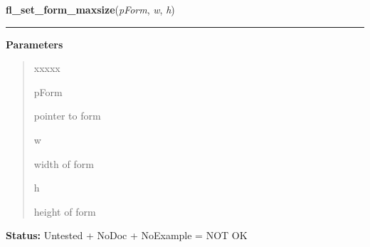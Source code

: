 \hspace{.8\funcindent}\begin{boxedminipage}{\funcwidth}

    \raggedright \textbf{fl\_set\_form\_maxsize}(\textit{pForm}, \textit{w}, \textit{h})

    \vspace{-1.5ex}

    \rule{\textwidth}{0.5\fboxrule}
\setlength{\parskip}{2ex}
\setlength{\parskip}{1ex}
      \textbf{Parameters}
      \vspace{-1ex}

      \begin{quote}
        \begin{Ventry}{xxxxx}

          \item[pForm]

          pointer to form

          \item[w]

          width of form

          \item[h]

          height of form

        \end{Ventry}

      \end{quote}

\textbf{Status:} Untested + NoDoc + NoExample = NOT OK



    \end{boxedminipage}

    \label{xformslib:library:fl_set_form_event_cmask}

    \vspace{0.5ex}


